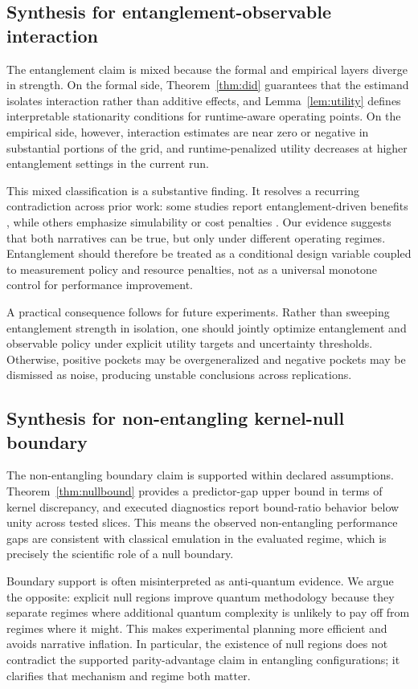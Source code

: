 \subsection{Synthesis for entanglement-observable interaction}
The entanglement claim is mixed because the formal and empirical layers diverge in strength. On the formal side, Theorem~\ref{thm:did} guarantees that the estimand isolates interaction rather than additive effects, and Lemma~\ref{lem:utility} defines interpretable stationarity conditions for runtime-aware operating points. On the empirical side, however, interaction estimates are near zero or negative in substantial portions of the grid, and runtime-penalized utility decreases at higher entanglement settings in the current run.

This mixed classification is a substantive finding. It resolves a recurring contradiction across prior work: some studies report entanglement-driven benefits \citep{S003,S033,S039}, while others emphasize simulability or cost penalties \citep{S002,S038}. Our evidence suggests that both narratives can be true, but only under different operating regimes. Entanglement should therefore be treated as a conditional design variable coupled to measurement policy and resource penalties, not as a universal monotone control for performance improvement.

A practical consequence follows for future experiments. Rather than sweeping entanglement strength in isolation, one should jointly optimize entanglement and observable policy under explicit utility targets and uncertainty thresholds. Otherwise, positive pockets may be overgeneralized and negative pockets may be dismissed as noise, producing unstable conclusions across replications.

\subsection{Synthesis for non-entangling kernel-null boundary}
The non-entangling boundary claim is supported within declared assumptions. Theorem~\ref{thm:nullbound} provides a predictor-gap upper bound in terms of kernel discrepancy, and executed diagnostics report bound-ratio behavior below unity across tested slices. This means the observed non-entangling performance gaps are consistent with classical emulation in the evaluated regime, which is precisely the scientific role of a null boundary.

Boundary support is often misinterpreted as anti-quantum evidence. We argue the opposite: explicit null regions improve quantum methodology because they separate regimes where additional quantum complexity is unlikely to pay off from regimes where it might. This makes experimental planning more efficient and avoids narrative inflation. In particular, the existence of null regions does not contradict the supported parity-advantage claim in entangling configurations; it clarifies that mechanism and regime both matter.

